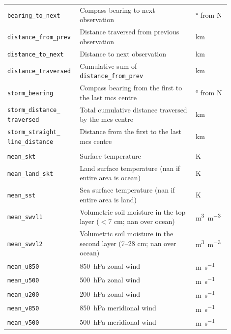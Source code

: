 {\begin{longtable}{>{\raggedright\arraybackslash}p{0.25\linewidth} p{0.50\linewidth} >{\raggedright\arraybackslash}p{0.15\linewidth}}
    \texttt{bearing\_to\_next} & Compass bearing to next observation & \unit{\degree} from  N \\
    \texttt{distance\_from\_prev} & Distance traversed from previous observation & \unit{\km} \\
    \texttt{distance\_to\_next} & Distance to next observation & \unit{\km} \\
    \texttt{distance\_traversed} & Cumulative sum of \texttt{distance\_from\_prev} & \unit{\km} \\
    \texttt{storm\_bearing} & Compass bearing from the first to the last \acrshort{mcs} centre & \unit{\degree} from  N \\
    \texttt{storm\_distance\_ traversed} & Total cumulative distance traversed by the \acrshort{mcs} centre & \unit{\km} \\
    \texttt{storm\_straight\_ line\_distance} & Distance from the first to the last \acrshort{mcs} centre & \unit{\km} \\
    \midrule
    \multicolumn{3}{c}{\textit{\acrshort{era5} meteorological features}} \\
    \midrule
    \texttt{mean\_skt} & Surface temperature & \unit{\kelvin} \\
    \texttt{mean\_land\_skt} & Land surface temperature (\acrshort{nan} if entire area is ocean) & \unit{\kelvin} \\
    \texttt{mean\_sst} & Sea surface temperature (\acrshort{nan} if entire area is land) & \unit{\kelvin} \\
    \texttt{mean\_swvl1} & Volumetric soil moisture in the top layer ($<$7 cm; \acrshort{nan} over ocean) & \unit{\meter\cubed\per\meter\cubed} \\
    \texttt{mean\_swvl2} & Volumetric soil moisture in the second layer (7--28 cm; \acrshort{nan} over ocean) & \unit{\meter\cubed\per\meter\cubed} \\
    \texttt{mean\_u850} & \SI{850}{\hecto\pascal} zonal wind & \unit{\meter\per\second} \\
    \texttt{mean\_u500} & \SI{500}{\hecto\pascal} zonal wind & \unit{\meter\per\second} \\
    \texttt{mean\_u200} & \SI{200}{\hecto\pascal} zonal wind & \unit{\meter\per\second} \\
    \texttt{mean\_v850} & \SI{850}{\hecto\pascal} meridional wind & \unit{\meter\per\second} \\
    \texttt{mean\_v500} & \SI{500}{\hecto\pascal} meridional wind & \unit{\meter\per\second} \\

\end{longtable}}
